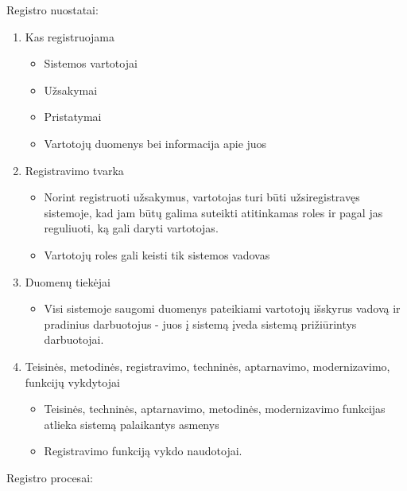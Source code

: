 \documentclass{VUMIFPSkursinis}
\begin{document}
Registro nuostatai:
\begin{enumerate}
    \item Kas registruojama
    \begin{itemize}
        \item Sistemos vartotojai
        \item Užsakymai
        \item Pristatymai
        \item Vartotojų duomenys bei informacija apie juos
    \end{itemize}
    \item Registravimo tvarka
    \begin{itemize}
        \item Norint registruoti užsakymus, vartotojas turi būti užsiregistravęs sistemoje, kad jam būtų galima suteikti atitinkamas roles ir pagal jas reguliuoti, ką gali daryti vartotojas.
        \item Vartotojų roles gali keisti tik sistemos vadovas
    \end{itemize}
    \item Duomenų tiekėjai 
    \begin{itemize}
        \item Visi sistemoje saugomi duomenys pateikiami vartotojų išskyrus vadovą ir pradinius darbuotojus - juos į sistemą įveda sistemą prižiūrintys darbuotojai.
    \end{itemize}
    \item Teisinės, metodinės, registravimo, techninės, aptarnavimo, modernizavimo, funkcijų vykdytojai
    \begin{itemize}
        \item Teisinės, techninės, aptarnavimo, metodinės, modernizavimo funkcijas atlieka sistemą palaikantys asmenys
        \item Registravimo funkciją vykdo naudotojai.
    \end{itemize}
\end{enumerate}
\bigbreak
Registro procesai:
\end{document}
